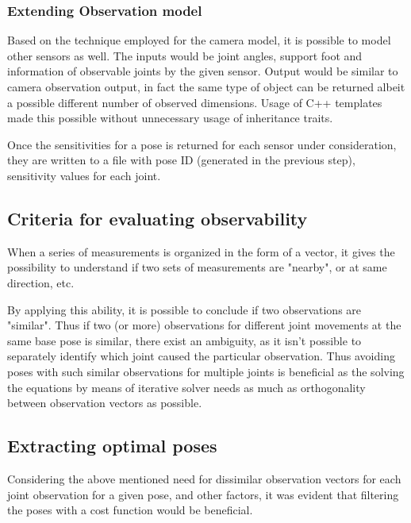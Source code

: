 \documentclass[english, printversion, nomenclature, notitle]{tuvisionthesis} %
\begin{document}

\subsubsection{Extending Observation model}

Based on the technique employed for the camera model, it is possible to model other sensors as well. The inputs would be joint angles, support foot and information of observable joints by the given sensor.
Output would be similar to camera observation output, in fact the same type of object can be returned albeit a possible different number of observed dimensions. Usage of C++ templates made this possible without unnecessary usage of inheritance traits. 

Once the sensitivities for a pose is returned for each sensor under consideration, they are written to a file with pose ID (generated in the previous step), sensitivity values for each joint. 
\subsection{Criteria for evaluating observability}

When a series of measurements is organized in the form of a vector, it gives the possibility to understand if two sets of measurements are "nearby", or at same direction, etc. 

By applying this ability, it is possible to conclude if two observations are "similar". Thus if two (or more) observations for different joint movements at the same base pose is similar, there exist an ambiguity, as it isn't possible to separately identify which joint caused the particular observation. Thus avoiding poses with such similar observations for multiple joints is beneficial as the solving the equations by means of iterative solver needs as much as orthogonality between observation vectors as possible.

\subsection{Extracting optimal poses}

Considering the above mentioned need for dissimilar observation vectors for each joint observation for a given pose, and other factors, it was evident that filtering the poses with a cost function would be beneficial.
\end{document}
